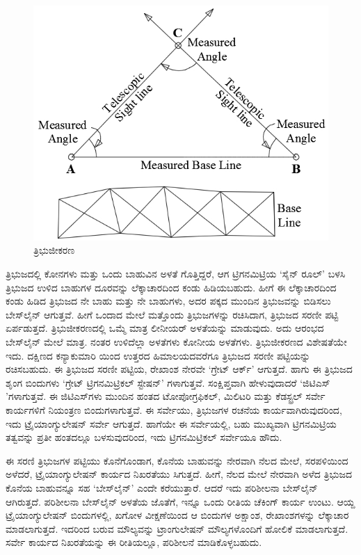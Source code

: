 \begin{figure}[!htbp]
\includegraphics[scale=.75]{"images/image003.jpg"}
\caption{ತ್ರಿಭುಜೀಕರಣ}\label{chap3-fig01}
\end{figure}

ತ್ರಿಭುಜದಲ್ಲಿ  ಕೋನಗಳು ಮತ್ತು ಒಂದು ಬಾಹುವಿನ ಅಳತೆ ಗೊತ್ತಿದ್ದರೆ, ಆಗ ಟ್ರಿಗನಮಿಟ್ರಿಯ ‘ಸೈನ್​ ರೂಲ್​’ ಬಳಸಿ ತ್ರಿಭುಜದ ಉಳಿದ  ಬಾಹುಗಳ ದೂರವನ್ನು ಲೆಕ್ಕಾಚಾರದಿಂದ ಕಂಡು ಹಿಡಿಯಬಹುದು. ಹೀಗೆ ಈ ಲೆಕ್ಕಾಚಾರದಿಂದ ಕಂಡು ಹಿಡಿದ ತ್ರಿಭುಜದ ನೇ ಬಾಹು ಮತ್ತು ನೇ ಬಾಹುಗಳು, ಅದರ ಪಕ್ಕದ ಮುಂದಿನ ತ್ರಿಭುಜವನ್ನು ಬಿಡಿಸಲು ಬೇಸ್‌ಲೈನ್​ ಆಗುತ್ತವೆ. ಹೀಗೆ ಒಂದಾದ ಮೇಲೆ ಮತ್ತೊಂದು ತ್ರಿಭುಜಗಳನ್ನು ರಚಿಸಿದಾಗ, ತ್ರಿಭುಜದ ಸರಣೀ ಪಟ್ಟಿ ಏರ್ಪಡುತ್ತದೆ. ತ್ರಿಭುಜೀಕರಣದಲ್ಲಿ ಒಮ್ಮೆ ಮಾತ್ರ ಲೀನೀಯರ್​ ಅಳತೆಯನ್ನು ಮಾಡುವುದು. ಅದು ಆರಂಭದ ಬೇಸ್‌ಲೈನ್​ ಮೇಲೆ ಮಾತ್ರ. ನಂತರ ಉಳಿದೆಲ್ಲಾ ಅಳತೆಗಳು ಕೋನೀಯ ಅಳತೆಗಳು. ತ್ರಿಭುಜೀಕರಣದ ವಿಶೇಷತೆಯೇ ಇದು. ದಕ್ಷಿಣದ ಕನ್ಯಾಕುಮಾರಿ ಯಿಂದ ಉತ್ತರದ ಹಿಮಾಲಯದವರೆಗೂ ತ್ರಿಭುಜದ ಸರಣೀ ಪಟ್ಟಿಯನ್ನು ರಚಿಸಬಹುದು. ಈ ತ್ರಿಭುಜದ ಸರಣೀ ಪಟ್ಟಿಯ, ರೇಖಾಂಶ ನೇರವೇ ‘ಗ್ರೇಟ್​ ಆರ್ಕ್’ ಆಗುತ್ತದೆ. ಹಾಗು ಈ ತ್ರಿಭುಜದ ಶೃಂಗ ಬಿಂದುಗಳು ‘ಗ್ರೇಟ್​ ಟ್ರಿಗನಮಿಟ್ರಿಕಲ್​ ಸ್ಟೇಷನ್​’ ಗಳಾಗುತ್ತವೆ. ಸಂಕ್ಷಿಪ್ತವಾಗಿ ಹೇಳುವುದಾದರೆ ‘ಜಿಟಿಎಸ್​’ಗಳಾಗುತ್ತವೆ. ಈ ಜಿಟಿಎಸ್​ಗಳು ಮುಂದಿನ ಹಂತದ ಟೋಪೋಗ್ರಫಿಕಲ್​, ಮಿಲಿಟರಿ ಮತ್ತು ಕೆಡಸ್ಟ್ರಲ್​ ಸರ್ವೇ ಕಾರ್ಯಗಳಿಗೆ ನಿಯಂತ್ರಣ ಬಿಂದುಗಳಾಗುತ್ತವೆ. ಈ ಸರ್ವೇಯು, ತ್ರಿಭುಜಗಳ ರಚನೆಯ ಕಾರ್ಯವಾಗಿರುವುದರಿಂದ, ಇದು ಟ್ರೈಯಾಂಗ್ಯುಲೇಷನ್​ ಸರ್ವೇ ಆಗುತ್ತದೆ. ಹಾಗೆಯೇ ಈ ಸರ್ವೇಯಲ್ಲಿ, ಬಹು ಮುಖ್ಯವಾಗಿ ಟ್ರಿಗನಮಿಟ್ರಿಯ ತತ್ವವನ್ನು ಪ್ರತೀ ಹಂತದಲ್ಲೂ ಬಳಸುವುದರಿಂದ, ಇದು ಟ್ರಿಗನಮಿಟ್ರಿಕಲ್​ ಸರ್ವೇಯೂ ಹೌದು.

ಈ ಸರಣಿ ತ್ರಿಭುಜಗಳ ಪಟ್ಟಿಯು ಕೊನೆಗೊಂಡಾಗ, ಕೊನೆಯ ಬಾಹುವನ್ನು ನೇರವಾಗಿ ನೆಲದ ಮೇಲೆ, ಸರಪಳಿಯಿಂದ ಅಳೆದರೆ, ಟ್ರೈಯಾಂಗ್ಯುಲೇಷನ್​ ಕಾರ್ಯದ ನಿಖರತೆಯು ಸಿಗುತ್ತದೆ. ಹೀಗೆ, ನೆಲದ ಮೇಲೆ ನೇರವಾಗಿ ಅಳೆದ ತ್ರಿಭುಜದ ಕೊನೆಯ ಬಾಹುವನ್ನೂ ಸಹ ‘ಬೇಸ್‌ಲೈನ್​’ ಎಂದೇ ಕರೆಯುತ್ತಾರೆ. ಆದರೆ ಇದು ಪರಿಶೀಲನಾ ಬೇಸ್‌ಲೈನ್​ ಆಗಿರುತ್ತದೆ. ಪರಿಶೀಲನಾ ಬೇಸ್‌ಲೈನ್​ ಅಳತೆಯ ಜೊತೆಗೆ, ಇನ್ನೂ ಒಂದು ರೀತಿಯ ಚೆಕಿಂಗ್​ ಕಾರ್ಯ ಉಂಟು. ಆಯ್ದ ಟ್ರೈಯಾಂಗ್ಯುಲೇಷನ್​ ಬಿಂದುಗಳಲ್ಲಿ, ಖಗೋಳ ವೀಕ್ಷಣೆಯಿಂದ ಆ ಬಿಂದುಗಳ ಅಕ್ಷಾಂಶ, ರೇಖಾಂಶಗಳನ್ನು ಲೆಕ್ಕಾಚಾರ ಮಾಡಲಾಗುತ್ತದೆ. ಇದರಿಂದ ಬರುವ ಮೌಲ್ಯವನ್ನು ಟ್ರಾಂಗುಲೇಷನ್​ ಮೌಲ್ಯಗಳೊಂದಿಗೆ ಹೋಲಿಕೆ ಮಾಡಲಾಗುತ್ತದೆ. ಸರ್ವೇ ಕಾರ್ಯದ ನಿಖರತೆಯನ್ನು ಈ ರೀತಿಯಲ್ಲೂ, ಪರಿಶೀಲನೆ ಮಾಡಿಕೊಳ್ಳಬಹುದು.

